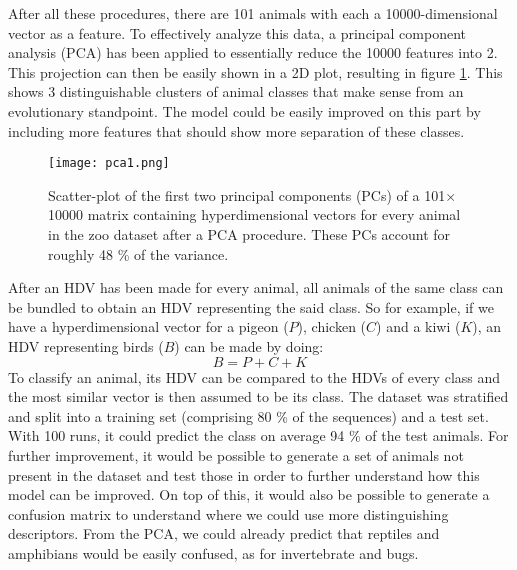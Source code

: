 After all these procedures, there are 101 animals with each a 10000-dimensional vector as a feature. To effectively analyze this data, a principal component analysis (PCA) has been applied to essentially reduce the 10000 features into 2. This projection can then be easily shown in a 2D plot, resulting in figure \ref{fig:exm2}. This shows 3 distinguishable clusters of animal classes that make sense from an evolutionary standpoint. The model could be easily improved on this part by including more features that should show more separation of these classes.
\begin{figure}[h]
    \centering
    \texttt{[image: pca1.png]}
    \caption{Scatter-plot of the first two principal components (PCs) of a 101$\times$10000 matrix containing hyperdimensional vectors for every animal in the zoo dataset after a PCA procedure. These PCs account for roughly 48 \% of the variance.}
    \label{fig:exm2}
\end{figure}

After an HDV has been made for every animal, all animals of the same class can be bundled to obtain an HDV representing the said class. So for example, if we have a hyperdimensional vector for a pigeon ($P$), chicken ($C$) and a kiwi ($K$), an HDV representing birds ($B$) can be made by doing:
\begin{equation}
    B = P + C + K
\end{equation} 
To classify an animal, its HDV can be compared to the HDVs of every class and the most similar vector is then assumed to be its class. The dataset was stratified and split into a training set (comprising 80 \% of the sequences) and a test set. With 100 runs, it could predict the class on average 94 \% of the test animals. For further improvement, it would be possible to generate a set of animals not present in the dataset and test those in order to further understand how this model can be improved. On top of this, it would also be possible to generate a confusion matrix to understand where we could use more distinguishing descriptors. From the PCA, we could already predict that reptiles and amphibians would be easily confused, as for invertebrate and bugs.
